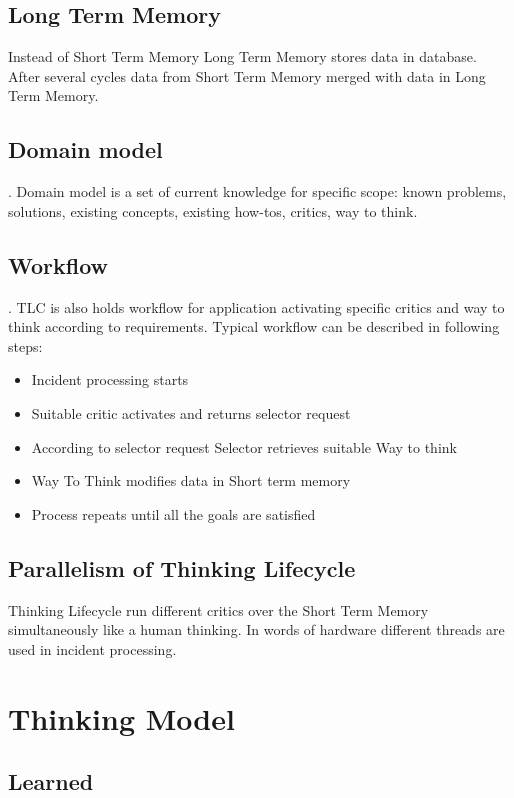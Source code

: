 \documentclass{llncs}
\begin{document}
\subsection{Long Term Memory}
Instead of Short Term Memory Long Term Memory stores data in database. After several cycles data from Short Term Memory merged with data in Long Term Memory.

\subsection{Domain model}. Domain model is a set of current knowledge for specific scope: known problems, solutions, existing concepts, existing how-tos, critics, way to think.\\

\subsection{Workflow}. TLC is also holds workflow for application activating specific critics and way to think according to requirements. Typical workflow can be described in following steps:

\begin{itemize}
 \item Incident processing starts
 \item Suitable critic activates and returns selector request
 \item According to selector request Selector retrieves suitable Way to think
 \item Way To Think modifies data in Short term memory
 \item Process repeats until all the goals are satisfied
\end{itemize}

\subsection{Parallelism of Thinking Lifecycle}
Thinking Lifecycle run different critics over the Short Term Memory simultaneously like a human thinking. In words of hardware different threads are used in incident processing.

\section{Thinking Model}

\subsection{Learned}
\end{document}
